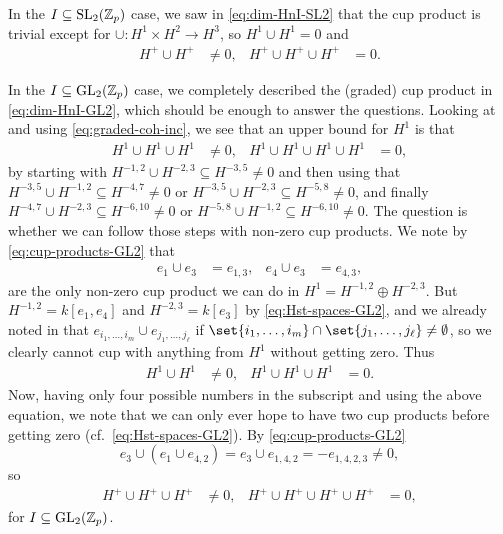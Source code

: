 In the $I \subseteq \operatorname{SL}_{2}(\mathbb{Z}_{p})$ case, we saw in \eqref{eq:dim-HnI-SL2} that the cup product is trivial except for $\cup \colon H^{1} \times H^{2} \to H^{3}$, so $H^{1} \cup H^{1} = 0$ and
\begin{align*}
  H^{+} \cup H^{+} &\neq 0, & H^{+} \cup H^{+} \cup H^{+} &= 0.
\end{align*}

In the $I \subseteq \operatorname{GL}_{2}(\mathbb{Z}_{p})$ case, we completely described the (graded) cup product in \eqref{eq:dim-HnI-GL2}, which should be enough to answer the questions. Looking at  and using \eqref{eq:graded-coh-inc}, we see that an upper bound for $H^{1}$ is that
\begin{align*}
  H^{1} \cup H^{1} \cup H^{1} &\neq 0, & H^{1} \cup H^{1} \cup H^{1} \cup H^{1} &= 0,
\end{align*}
by starting with $H^{-1,2} \cup H^{-2,3} \subseteq H^{-3,5} \neq 0$ and then using that $H^{-3,5} \cup H^{-1,2} \subseteq H^{-4,7} \neq 0$ or $H^{-3,5} \cup H^{-2,3} \subseteq H^{-5,8} \neq 0$, and finally  $H^{-4,7} \cup H^{-2,3} \subseteq H^{-6,10} \neq 0$ or $H^{-5,8} \cup H^{-1,2} \subseteq H^{-6,10}\neq0$. The question is whether we can follow those steps with non-zero cup products. We note by \eqref{eq:cup-products-GL2} that
\begin{align*}
  e_{1} \cup e_{3} &= e_{1,3}, & e_{4} \cup e_{3} &= e_{4,3},
\end{align*}
are the only non-zero cup product we can do in $H^{1} = H^{-1,2} \oplus H^{-2,3}$. But $H^{-1,2} = k[e_{1},e_{4}]$ and $H^{-2,3} = k[e_{3}]$ by \eqref{eq:Hst-spaces-GL2}, and we already noted in  that $e_{i_{1},\dotsc,i_{m}} \cup e_{j_{1},\dotsc,j_{\ell}}$ if $\set{i_{1},\dotsc,i_{m}} \cap \set{j_{1},\dotsc,j_{\ell}} \neq \emptyset$, so we clearly cannot cup with anything from $H^{1}$ without getting zero. Thus
\begin{align*}
  H^{1} \cup H^{1} &\neq 0, & H^{1} \cup H^{1} \cup H^{1} &= 0.
\end{align*}
Now, having only four possible numbers in the subscript and using the above equation, we note that we can only ever hope to have two cup products before getting zero (cf.\ \eqref{eq:Hst-spaces-GL2}). By \eqref{eq:cup-products-GL2}
\begin{equation*}
  e_{3} \cup (e_{1} \cup e_{4,2}) = e_{3} \cup e_{1,4,2} = -e_{1,4,2,3} \neq 0,
\end{equation*}
so
\begin{align*}
  H^{+} \cup H^{+} \cup H^{+} &\neq 0, & H^{+} \cup H^{+} \cup H^{+} \cup H^{+} &= 0,
\end{align*}
for $I \subseteq \operatorname{GL}_{2}(\mathbb{Z}_{p})$.


